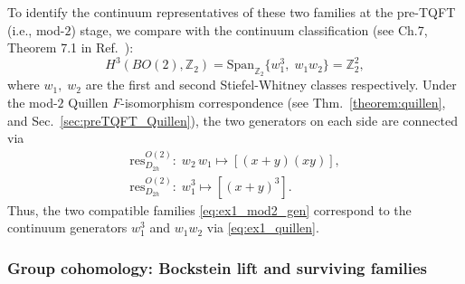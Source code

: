 \documentclass[aps,prx,reprint,superscriptaddress,twocolumn,amsmath,amssymb,amsfonts, nofootinbib]{revtex4-2}
\newcommand{\res}{\text{res}}
\theoremstyle{apsstyle}
\begin{document}
\bigskip 

To identify the continuum representatives of these two families at the pre-TQFT (i.e., mod-$2$) stage, we compare with the continuum classification (see Ch.7, Theorem 7.1 in Ref.~\cite{Milnor}):
\begin{equation*}
    H^{3}(BO(2), \mathbb{Z}_{2}) = \mathrm{Span}_{\mathbb{Z}_{2}}\{w_{1}^{3}, \; w_{1}w_{2}\}=\mathbb{Z}_{2}^{2},
\end{equation*}
where $w_{1},\; w_{2}$ are the first and second Stiefel-Whitney classes respectively. Under the 
mod-$2$ Quillen $F$-isomorphism correspondence (see Thm.~\ref{theorem:quillen}, and Sec.~\ref{sec:preTQFT_Quillen}), the two generators on each side are connected via 
\begin{equation}
\begin{gathered}
    \res^{O(2)}_{D_{2h}}  :\; w_2\,w_1 \longmapsto [(x{+}y)(xy)],\\
    \res^{O(2)}_{D_{2h}}  :\; w_1^{3} \longmapsto [(x{+}y)^3].
    \label{eq:ex1_quillen}
    \end{gathered}
\end{equation} Thus, the two compatible families \eqref{eq:ex1_mod2_gen} correspond to the continuum generators $w_1^3$ and $w_1w_2$ via \eqref{eq:ex1_quillen}.

\subsubsection{Group cohomology: Bockstein lift and surviving families}
\label{sec:example_1_grpcoh}
\end{document}
